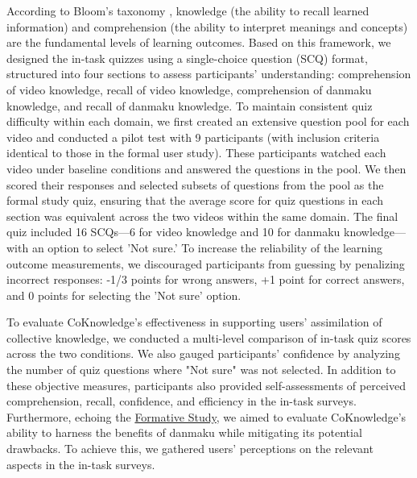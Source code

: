 According to Bloom’s taxonomy \cite{bloom1971taxonomy}, knowledge (the ability to recall learned information) and comprehension (the ability to interpret meanings and concepts) are the fundamental levels of learning outcomes. Based on this framework, we designed the in-task quizzes using a single-choice question (SCQ) format, structured into four sections to assess participants' understanding: comprehension of video knowledge, recall of video knowledge, comprehension of danmaku knowledge, and recall of danmaku knowledge. 
To maintain consistent quiz difficulty within each domain, we first created an extensive question pool for each video and conducted a pilot test with 9 participants (with inclusion criteria identical to those in the formal user study). These participants watched each video under baseline conditions and answered the questions in the pool. We then scored their responses and selected subsets of questions from the pool as the formal study quiz, ensuring that the average score for quiz questions in each section was equivalent across the two videos within the same domain. The final quiz included 16 SCQs—6 for video knowledge and 10 for danmaku knowledge—with an option to select 'Not sure.' To increase the reliability of the learning outcome measurements, we discouraged participants from guessing by penalizing incorrect responses: -1/3 points for wrong answers, +1 point for correct answers, and 0 points for selecting the 'Not sure' option.

To evaluate CoKnowledge's effectiveness in supporting users' assimilation of collective knowledge, we conducted a multi-level comparison of in-task quiz scores across the two conditions. We also gauged participants' confidence by analyzing the number of quiz questions where "Not sure" was not selected. In addition to these objective measures, participants also provided self-assessments of perceived comprehension, recall, confidence, and efficiency in the in-task surveys.
Furthermore, echoing the \hyperref[formative-study]{Formative Study}, we aimed to evaluate CoKnowledge's ability to harness the benefits of danmaku while mitigating its potential drawbacks. To achieve this, we gathered users' perceptions on the relevant aspects in the in-task surveys.%

